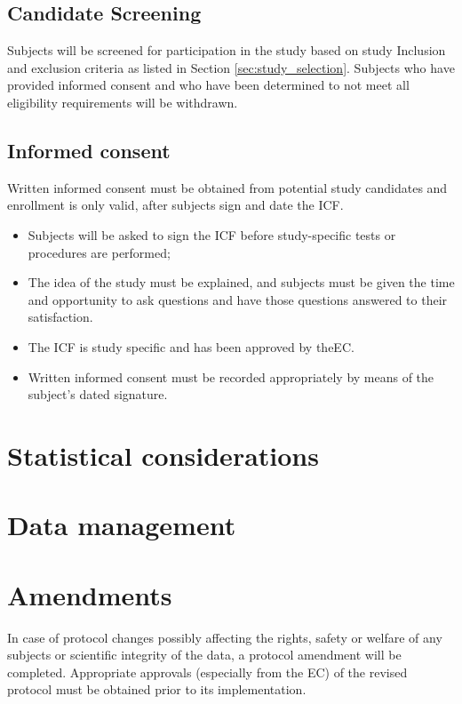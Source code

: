 \documentclass[
	a4paper, 
	11.5pt,
	headings=small, 
	twoside, 
	titlepage=firstiscover, 
 	pagesize=auto,
  	version=last,
	open=any,
	BCOR=12mm,
  	chapterprefix=false]{scrbook}
\begin{document}
\subsection{Candidate Screening}
Subjects will be screened for participation in the study based on study Inclusion and exclusion criteria as listed in Section \ref{sec:study_selection}. Subjects who have provided informed consent and who have been determined to not meet all eligibility requirements will be withdrawn.

\subsection{Informed consent}
Written informed consent must be obtained from potential study candidates and enrollment is only valid, after subjects sign and date the \ac{ICF}.
\begin{itemize}
\item Subjects will be asked to sign the \ac{ICF} before study-specific tests or procedures are performed;
\item The idea of the study must be explained, and subjects must be given the time and opportunity to ask questions and have those questions answered to their satisfaction.
\item The \ac{ICF} is study specific and has been approved by the\ac{EC}.
\item Written informed consent must be recorded appropriately by means of the subject’s dated signature.
\end{itemize}

\section{Statistical considerations}

\section{Data management}

\section{Amendments}
In case of protocol changes possibly affecting the rights, safety or welfare of any subjects or scientific integrity of the data, a protocol amendment will be completed. Appropriate approvals (especially from the \ac{EC}) of the revised protocol must be obtained prior to its implementation.
\end{document}
